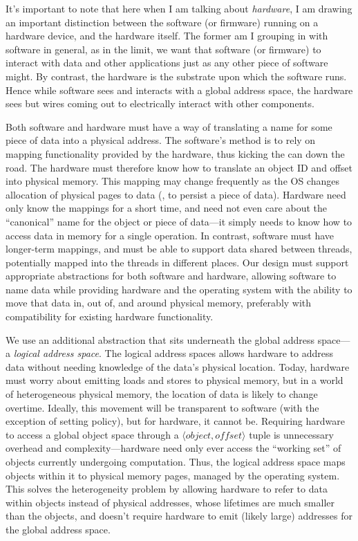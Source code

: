 It's important to note that here when I am talking about \emph{hardware}, I am drawing an important distinction between
the software (or firmware) running on a hardware device, and the hardware itself. The former am I grouping in with
software in general, as in the limit, we want that software (or firmware) to interact with data and other applications
just as any other piece of software might. By contrast, the hardware is the substrate upon which the software runs.
Hence while software sees and interacts with a global address space, the hardware sees but wires coming out to
electrically interact with other components.


Both software and hardware must have a way of translating a
name for some piece of data into a physical address. The software's method is to rely on mapping functionality provided
by the hardware, thus kicking the can down the road. The hardware must therefore know how to translate an object ID and
offset into physical memory.
This mapping may change frequently as the OS changes allocation of physical
pages to data (\eg, to persist a piece of data).
Hardware need only know
the mappings for a short time, and need not even care about the ``canonical''
name for the object or piece of data---it simply needs to know
how to access data in memory
for a single operation. In contrast, software must have longer-term mappings, and must
be able to support data shared between threads, potentially mapped into the threads
in different places.
Our design must support appropriate abstractions for both software and hardware,
allowing software to name data while providing hardware and
the operating system with the ability to move that data in, out of, and around physical memory, preferably with
compatibility for
existing hardware functionality.

We use an additional abstraction that sits underneath the global address space---a \emph{logical address space}. The
logical address spaces allows hardware to address data without needing knowledge of the data's physical location. Today,
hardware must worry about emitting loads and stores to physical memory, but in a world of heterogeneous physical memory,
the location of data is likely to change overtime. Ideally, this movement will be transparent to software (with the
exception of setting policy), but for hardware, it cannot be. Requiring hardware to access a global object space through a $\langle \mathit{object},
    \mathit{offset} \rangle$ tuple is unnecessary overhead and complexity---hardware need only ever
access the ``working set'' of objects currently undergoing computation. Thus, the logical address space
maps objects within it to physical memory pages, managed by the
operating system. This solves the heterogeneity problem by allowing hardware to refer to data within
objects instead of physical addresses, whose lifetimes are much smaller than the objects, and
doesn't require hardware to emit (likely large) addresses for the global address space.

